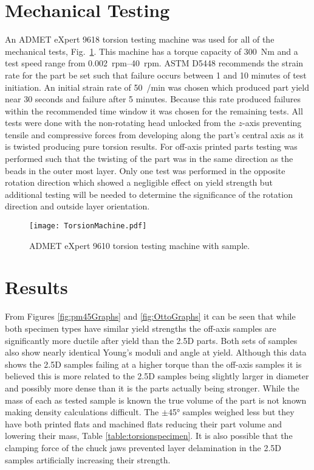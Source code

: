 \documentclass[main.tex]{subfiles}
\begin{document}
\section{Mechanical Testing}
An ADMET eXpert 9618 torsion testing machine was used for all of the mechanical tests, Fig.~\ref{fig:torsionmachine}.
This machine has a torque capacity of \SI{300}{Nm} and a test speed range from \SIrange{0.002}{40}{rpm}.
ASTM D5448 \cite{ShearMethod2012} recommends the strain rate for the part be set such that failure occurs between 1 and 10 minutes of test initiation. 
An initial strain rate of \SI{50}{\deg/min} was chosen which produced part yield near 30 seconds and failure after 5 minutes.
Because this rate produced failures within the recommended time window it was chosen for the remaining tests.
All tests were done with the non-rotating head unlocked from the $z$\nobreakdash-axis preventing tensile and compressive forces from developing along the part's central axis as it is twisted producing pure torsion results.
For off-axis printed parts testing was performed such that the twisting of the part was in the same direction as the beads in the outer most layer.
Only one test was performed in the opposite rotation direction which showed a negligible effect on yield strength but additional testing will be needed to determine the significance of the rotation direction and outside layer orientation.

\begin{figure}
\centering
	\texttt{[image: TorsionMachine.pdf]}
	\caption{ADMET eXpert 9610 torsion testing machine with sample.}
	\label{fig:torsionmachine}
\end{figure}

\section{Results}
From Figures \ref{fig:pm45Graphs} and \ref{fig:OttoGraphs} it can be seen that while both specimen types have similar yield strengths the off-axis samples are significantly more ductile after yield than the 2.5D parts.
Both sets of samples also show nearly identical Young's moduli and angle at yield.
Although this data shows the 2.5D samples failing at a higher torque than the off-axis samples it is believed this is more related to the 2.5D samples being slightly larger in diameter and possibly more dense than it is the parts actually being stronger.
While the mass of each as tested sample is known the true volume of the part is not known making density calculations difficult.
The $\pm$\ang{45} samples weighed less but they have both printed flats and machined flats reducing their part volume and lowering their mass, Table \ref{table:torsionspecimen}.
It is also possible that the clamping force of the chuck jaws prevented layer delamination in the 2.5D samples artificially increasing their strength.
\end{document}
